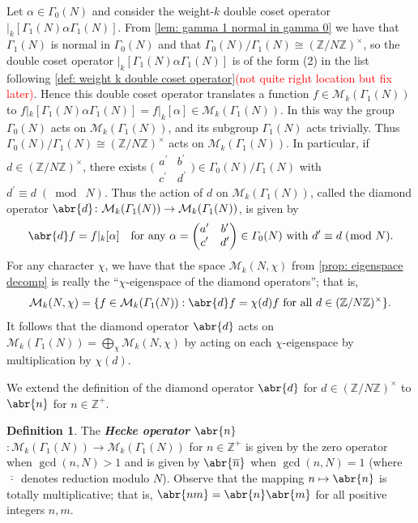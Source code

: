 \documentclass[10pt,leqno,twoside]{article}
\theoremstyle{plain}
\theoremstyle{definition}
\newtheorem{definition/}[lem]{Definition}
\newenvironment{definition}
  {\renewcommand{\qedsymbol}{\textdagger}%
   \pushQED{\qed}\begin{definition/}}
  {\popQED\end{definition/}}
\numberwithin{equation}{section}
\numberwithin{lem}{section}
\newcommand{\textib}[1]{\textbf{\textit{#1\index{#1}}}} %
\newcommand{\smod}[1]{\;(\bmod\; #1)}
\newcommand{\sai}[1]{\textcolor{red}{#1}}
\begin{document}
Let $\alpha\in\varGamma_0(N)$ and consider the weight-$k$ double coset operator $|_k[\varGamma_1(N)\alpha\varGamma_1(N)]$. From \cref{lem: gamma 1 normal in gamma 0} we have that $\varGamma_1(N)$ is normal in $\varGamma_0(N)$ and that $\varGamma_0(N)/\varGamma_1(N)\cong (\mathbb Z/N\mathbb Z)^\times$, so the double coset operator $|_k[\varGamma_1(N)\alpha\varGamma_1(N)]$ is of the form (2) in the list following \cref{def: weight k double coset operator}\sai{(not quite right location but fix later)}. Hence this double coset operator translates a function $f\in \mathcal M_k(\varGamma_1(N))$ to $f|_k[\varGamma_1(N)\alpha\varGamma_1(N)] = f|_k[\alpha]\in \mathcal M_k(\varGamma_1(N))$. In this way the group $\varGamma_0(N)$ acts on $\mathcal M_k(\varGamma_1(N))$, and its subgroup $\varGamma_1(N)$ acts trivially. Thus $\varGamma_0(N)/\varGamma_1(N)\cong (\mathbb Z/N\mathbb Z)^\times$ acts on $\mathcal M_k(\varGamma_1(N))$. In particular, if $d\in (\mathbb Z/N\mathbb Z)^\times$, there exists $\big(\!\begin{smallmatrix}
    a^\prime & b^\prime \\ c^\prime & d^\prime
\end{smallmatrix}\!\big)\in \varGamma_0(N)/\varGamma_1(N)$ with $d^\prime\equiv d\smod N$. Thus the action of $d$ on $\mathcal M_k(\varGamma_1(N))$, called the diamond operator $\abr{d}\colon \mathcal M_k(\varGamma_1(N))\to \mathcal M_k(\varGamma_1(N))$, is given by 
\[\abr{d}f = f|_k[\alpha] \quad \text{for any $\alpha = \begin{pmatrix}
    a^\prime & b^\prime \\ c^\prime & d^\prime
\end{pmatrix}\in \varGamma_0(N)$ with $d^\prime\equiv d\smod N$}.\]
For any character $\chi$, we have that the space $\mathcal M_k(N,\chi)$ from \cref{prop: eigenspace decomp} is really the ``$\chi$-eigenspace of the diamond operators''; that is,
\[\mathcal M_k(N,\chi) = \{f\in \mathcal M_k(\varGamma_1(N)) : \abr{d}f = \chi(d)f \text{ for all } d\in(\mathbb Z/N\mathbb Z)^\times\}.\] 
It follows that the diamond operator $\abr{d}$ acts on $\mathcal M_k(\varGamma_1(N)) = \bigoplus_\chi\mathcal M_k(N,\chi)$ by acting on each $\chi$-eigenspace by multiplication by $\chi(d)$.

We extend the definition of the diamond operator $\abr{d}$ for $d\in (\mathbb Z/N\mathbb Z)^\times$ to $\abr{n}$ for $n\in\mathbb{Z}^+$.
\begin{definition}
    The \textib{Hecke operator $\abr{n}$}$\colon \mathcal M_k(\varGamma_1(N))\to \mathcal M_k(\varGamma_1(N))$ for $n\in\mathbb{Z}^+$ is given by the zero operator when $\gcd(n,N)>1$ and is given by $\abr{\overline n}$ when $\gcd(n,N) = 1$ (where $\overline{\,\cdot\,}$ denotes reduction modulo $N$). Observe that the mapping $n\mapsto \abr{n}$ is totally multiplicative; that is, $\abr{nm} = \abr{n}\abr{m}$ for all positive integers $n,m$.
\end{definition}
\end{document}
